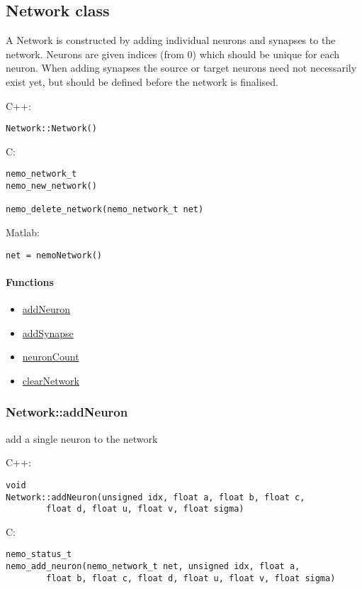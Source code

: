 \subsection{Network class}
\label{Network}
A Network is constructed by adding individual neurons and synapses to the network. Neurons are given indices (from 0) which should be unique for each neuron. When adding synapses the source or target neurons need not necessarily exist yet, but should be defined before the network is finalised.

\noindent C++:
\begin{lstlisting}[aboveskip=2pt]
Network::Network()
\end{lstlisting}

\noindent C:
\begin{lstlisting}[aboveskip=2pt]
nemo_network_t
nemo_new_network()
 
nemo_delete_network(nemo_network_t net)
\end{lstlisting}

\noindent Matlab:
\begin{lstlisting}[aboveskip=2pt]
net = nemoNetwork()
\end{lstlisting}
\paragraph{Functions}
\begin{itemize}
\item \hyperref[fn: addNeuron]{addNeuron}
\item \hyperref[fn: addSynapse]{addSynapse}
\item \hyperref[fn: neuronCount]{neuronCount}
\item \hyperref[fn: clearNetwork]{clearNetwork}
\end{itemize}
\clearpage
\subsubsection*{Network::addNeuron}
\label{fn: addNeuron}
add a single neuron to the network


\noindent C++:
\begin{lstlisting}[aboveskip=2pt]
void
Network::addNeuron(unsigned idx, float a, float b, float c, 
        float d, float u, float v, float sigma)
\end{lstlisting}

\noindent C:
\begin{lstlisting}[aboveskip=2pt]
nemo_status_t
nemo_add_neuron(nemo_network_t net, unsigned idx, float a, 
        float b, float c, float d, float u, float v, float sigma)
\end{lstlisting}

